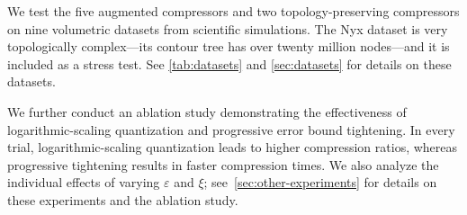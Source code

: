 We test the five augmented compressors and two topology-preserving compressors on nine volumetric datasets from scientific simulations. The Nyx dataset is very topologically complex---its contour tree has over twenty million nodes---and it is included as a stress test. See \cref{tab:datasets} and \cref{sec:datasets} for details on these datasets.

We further conduct an ablation study demonstrating the effectiveness of logarithmic-scaling quantization and progressive error bound tightening. In every trial, logarithmic-scaling quantization leads to higher compression ratios, whereas progressive tightening results in faster compression times. We also analyze the individual effects of varying $\varepsilon$ and $\xi$; see~\cref{sec:other-experiments} for details on these experiments and the ablation study.

\begin{table}[!ht]
\scriptsize
{}
\vspace{-2mm}
\caption{Scientific datasets used for compression analysis.}
\label{tab:datasets}
\vspace{-4mm}
\end{table}

